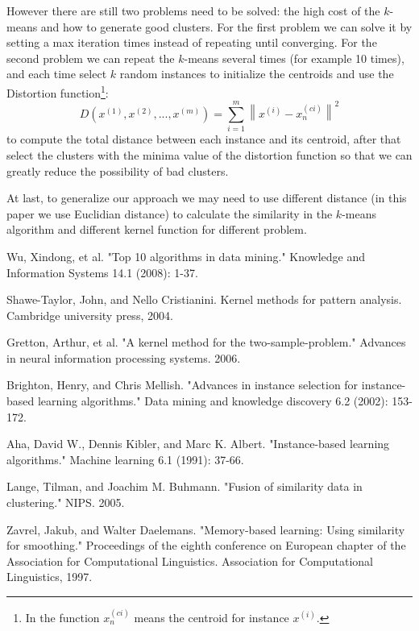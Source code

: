 \documentclass[runningheads,a4paper]{llncs}
\begin{document}
		However there are still two problems need to be solved: the high cost of the $k$-means and how to generate
		good clusters. For the first problem we can solve it by setting a max iteration times instead of 
		repeating until converging. For the second problem we can repeat the $k$-means several times (for example 10 times), 
		and each time select $k$ random instances to initialize the centroids and use the Distortion function\footnote{ 
		In the function $x_n^{(ci)}$ means the centroid for instance $x^{(i)}$.}:
		\[
			D({x^{(1)}},{x^{(2)}},...,{x^{(m)}}) = \sum\limits_{i = 1}^m {{{\left\| {{x^{(i)}} - x_n^{(ci)}} \right\|}^2}} 
		\]
		to compute the total distance between each instance and its centroid, after that select the clusters with the 
		minima value of the distortion function so that we can greatly reduce the possibility of bad clusters.
		
		At last, to generalize our approach we may need to use different distance (in this paper we use 
		Euclidian distance) to calculate the similarity in the $k$-means algorithm and different kernel function 
		for different problem.


\begin{thebibliography}{4}

 Wu, Xindong, et al. "Top 10 algorithms in data mining." 
Knowledge and Information Systems 14.1 (2008): 1-37.

Shawe-Taylor, John, and Nello Cristianini. 
Kernel methods for pattern analysis. Cambridge university press, 2004.

Gretton, Arthur, et al. "A kernel method for the 
two-sample-problem." Advances in neural information processing systems. 2006.

Brighton, Henry, and Chris Mellish. "Advances in instance 
selection for instance-based learning algorithms." Data mining and knowledge discovery 6.2 (2002): 153-172.

 Aha, David W., Dennis Kibler, and Marc K. Albert. 
"Instance-based learning algorithms." Machine learning 6.1 (1991): 37-66.

 Lange, Tilman, and Joachim M. Buhmann. "Fusion of similarity data in clustering." NIPS. 2005.

 Zavrel, Jakub, and Walter Daelemans. "Memory-based learning: 
Using similarity for smoothing." Proceedings of the eighth conference on European 
chapter of the Association for Computational Linguistics. Association for Computational Linguistics, 1997.

\end{thebibliography}
\end{document}
